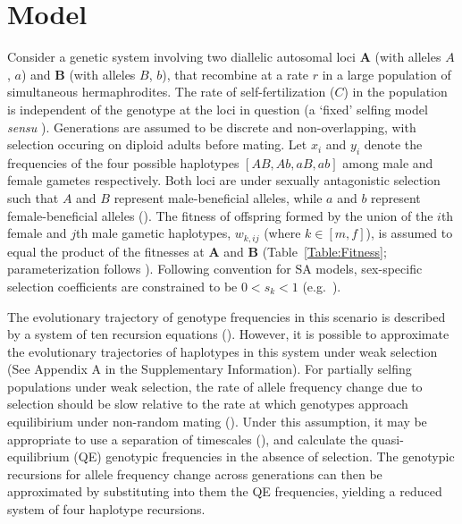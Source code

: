 \documentclass{article}
\begin{document}
\section*{Model}

Consider a genetic system involving two diallelic autosomal loci $\mathbf{A}$ (with alleles $A$, $a$) and $\mathbf{B}$ (with alleles $B$, $b$), that recombine at a rate $r$ in a large population of simultaneous hermaphrodites. The rate of self-fertilization ($C$) in the population is independent of the genotype at the loci in question (a `fixed' selfing model \textit{sensu} \citealt{Holden1979,CaballeroHill1992, JordanConn2014}). Generations are assumed to be discrete and non-overlapping, with selection occuring on diploid adults before mating. Let $x_i$ and $y_i$ denote the frequencies of the four possible haplotypes $[AB, Ab, aB, ab]$ among male and female gametes respectively. Both loci are under sexually antagonistic selection such that $A$ and $B$ represent male-beneficial alleles, while $a$ and $b$ represent female-beneficial alleles (\citealt{Kidwell1977}). The fitness of offspring formed by the union of the $i$th female and $j$th male gametic haplotypes, $w_{k,ij}$ (where $k \in [m,f]$), is assumed to equal the product of the fitnesses at $\mathbf{A}$ and $\mathbf{B}$ (Table~\ref{Table:Fitness}; parameterization follows \citealt{Patten2010}). Following convention for SA models, sex-specific selection coefficients are constrained to be $0 < s_k < 1$ (e.g.~\citealt{Kidwell1977}).

The evolutionary trajectory of genotype frequencies in this scenario is described by a system of ten recursion equations (\citealt{Holden1979, JordanConn2014}). However, it is possible to approximate the evolutionary trajectories of haplotypes in this system under weak selection (See Appendix A in the Supplementary Information). For partially selfing populations under weak selection, the rate of allele frequency change due to selection should be slow relative to the rate at which genotypes approach equilibirium under non-random mating (\citealt{Nagylaki1997}). Under this assumption, it may be appropriate to use a separation of timescales (\citealt{OttoDay2007}), and calculate the quasi-equilibrium (QE) genotypic frequencies in the absence of selection. The genotypic recursions for allele frequency change across generations can then be approximated by substituting into them the QE frequencies, yielding a reduced system of four haplotype recursions. 
\end{document}
